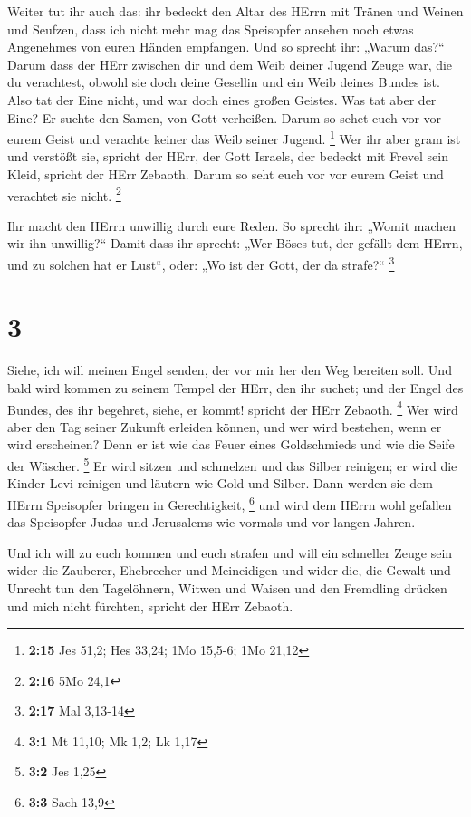  Weiter tut ihr auch das: ihr bedeckt den Altar des HErrn
mit Tränen und Weinen und Seufzen, dass ich nicht mehr mag das
Speisopfer ansehen noch etwas Angenehmes von euren Händen empfangen.
 Und so sprecht ihr: „Warum das?{}`` Darum dass der HErr
zwischen dir und dem Weib deiner Jugend Zeuge war, die du verachtest,
obwohl sie doch deine Gesellin und ein Weib deines Bundes ist.
 Also tat der Eine nicht, und war doch eines großen
Geistes. Was tat aber der Eine? Er suchte den Samen, von Gott verheißen.
Darum so sehet euch vor vor eurem Geist und verachte keiner das Weib
seiner Jugend. \footnote{\textbf{2:15} Jes 51,2; Hes 33,24; 1Mo 15,5-6;
  1Mo 21,12}  Wer ihr aber gram ist und verstößt sie,
spricht der HErr, der Gott Israels, der bedeckt mit Frevel sein Kleid,
spricht der HErr Zebaoth. Darum so seht euch vor vor eurem Geist und
verachtet sie nicht. \footnote{\textbf{2:16} 5Mo 24,1}

 Ihr macht den HErrn unwillig durch eure Reden. So sprecht
ihr: „Womit machen wir ihn unwillig?{}`` Damit dass ihr sprecht: „Wer
Böses tut, der gefällt dem HErrn, und zu solchen hat er Lust``, oder:
„Wo ist der Gott, der da strafe?{}`` \footnote{\textbf{2:17} Mal 3,13-14}

\hypertarget{section-2}{%
\section{3}\label{section-2}}

 Siehe, ich will meinen Engel senden, der vor mir her den
Weg bereiten soll. Und bald wird kommen zu seinem Tempel der HErr, den
ihr suchet; und der Engel des Bundes, des ihr begehret, siehe, er kommt!
spricht der HErr Zebaoth. \footnote{\textbf{3:1} Mt 11,10; Mk 1,2; Lk
  1,17}  Wer wird aber den Tag seiner Zukunft erleiden
können, und wer wird bestehen, wenn er wird erscheinen? Denn er ist wie
das Feuer eines Goldschmieds und wie die Seife der Wäscher. \footnote{\textbf{3:2}
  Jes 1,25}  Er wird sitzen und schmelzen und das Silber
reinigen; er wird die Kinder Levi reinigen und läutern wie Gold und
Silber. Dann werden sie dem HErrn Speisopfer bringen in Gerechtigkeit,
\footnote{\textbf{3:3} Sach 13,9}  und wird dem HErrn wohl
gefallen das Speisopfer Judas und Jerusalems wie vormals und vor langen
Jahren.

 Und ich will zu euch kommen und euch strafen und will ein
schneller Zeuge sein wider die Zauberer, Ehebrecher und Meineidigen und
wider die, die Gewalt und Unrecht tun den Tagelöhnern, Witwen und Waisen
und den Fremdling drücken und mich nicht fürchten, spricht der HErr
Zebaoth.

